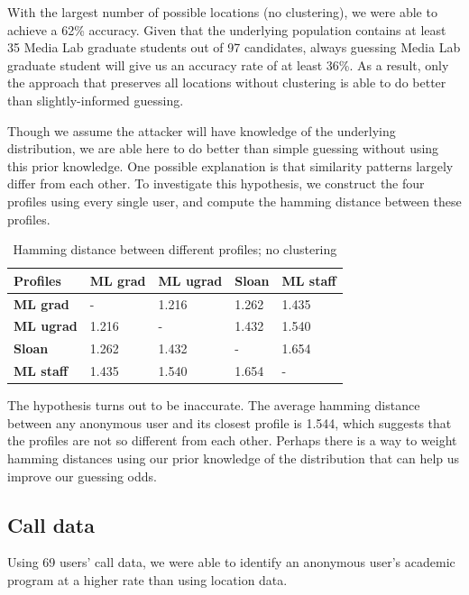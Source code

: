 \documentclass[pageno]{jpaper}
\begin{document}
With the largest number of possible locations (no clustering), we were able to achieve a 62\% accuracy. Given that the underlying population contains at least 35 Media Lab graduate students out of 97 candidates, always guessing Media Lab graduate student will give us an accuracy rate of at least 36\%.  As a result, only the approach that preserves all locations without clustering is able to do better than slightly-informed guessing. 

Though we assume the attacker will have knowledge of the underlying distribution, we are able here to do better than simple guessing without using this prior knowledge. One possible explanation is that similarity patterns largely differ from each other. To investigate this hypothesis, we construct the four profiles using every single user, and compute the hamming distance between these profiles. 

\begin{table}[h!]
  \centering
  \begin{tabular}{|l|l|l|l|l|}
    \hline
    \textbf{Profiles} & \textbf{ML grad} & \textbf{ML ugrad} & \textbf{Sloan} & \textbf{ML staff}\\
    \hline
    \hline
    \textbf{ML grad} & - & 1.216 & 1.262 & 1.435\\
    \hline
    \textbf{ML ugrad} & 1.216  & - & 1.432 & 1.540\\
    \hline
    \textbf{Sloan} & 1.262 & 1.432 & - & 1.654\\
    \hline
    \textbf{ML staff} &  1.435 & 1.540 & 1.654& -\\
    \hline
  \end{tabular}
  \caption{Hamming distance between different profiles; no clustering}
  \label{table:formatting}
\end{table}
 
The hypothesis turns out to be inaccurate. The average hamming distance between any anonymous user and its closest profile is 1.544, which suggests that the profiles are not so different from each other. Perhaps there is a way to weight hamming distances using our prior knowledge of the distribution that can help us improve our guessing odds.

\subsection{Call data}

Using 69 users' call data, we were able to identify an anonymous user's academic program at a higher rate than using location data.
\end{document}
